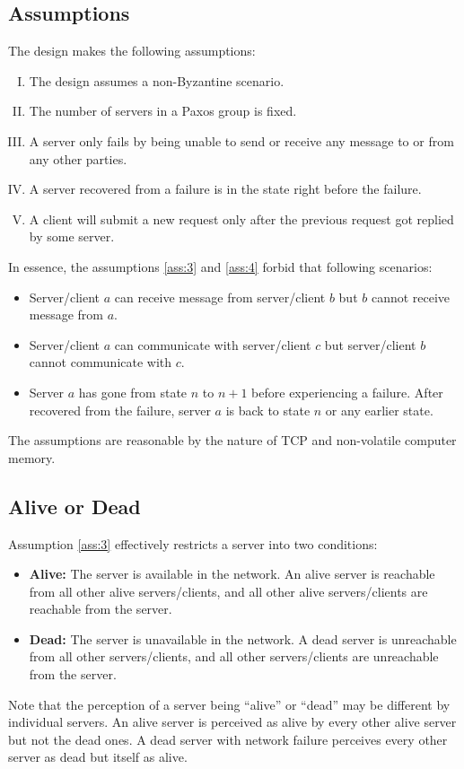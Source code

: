\documentclass{article}
\numberwithin{equation}{section}
\begin{document}
\subsection{Assumptions}
The design makes the following assumptions:
\begin{enumerate}[(I)]
	\item The design assumes a non-Byzantine scenario.
	\item The number of servers in a Paxos group is fixed.
	\item\label{ass:3} A server only fails by being unable to send or receive any message to or from any other parties.
	\item\label{ass:4} A server recovered from a failure is in the state right before the failure.
	\item\label{ass:5} A client will submit a new request only after the previous request got replied by some server.
\end{enumerate}
In essence, the assumptions \ref{ass:3} and \ref{ass:4} forbid that following scenarios:
\begin{itemize}
	\item Server/client $a$ can receive message from server/client $b$ but $b$ cannot receive message from $a$.
	\item Server/client $a$ can communicate with server/client $c$ but server/client $b$ cannot communicate with $c$.
	\item Server $a$ has gone from state $n$ to $n+1$ before experiencing a failure. After recovered from the failure, server $a$ is back to state $n$ or any earlier state.
\end{itemize}
The assumptions are reasonable by the nature of TCP and non-volatile computer memory.

\subsection{Alive or Dead}
Assumption \ref{ass:3} effectively restricts a server into two conditions:
\begin{itemize}
	\item \textbf{Alive:} The server is available in the network. An alive server is reachable from all other alive servers/clients, and all other alive servers/clients are reachable from the server.
	\item \textbf{Dead:} The server is unavailable in the network. A dead server is unreachable from all other servers/clients, and all other servers/clients are unreachable from the server.
\end{itemize}
Note that the perception of a server being ``alive'' or ``dead'' may be different by individual servers. An alive server is perceived as alive by every other alive server but not the dead ones. A dead server with network failure perceives every other server as dead but itself as alive.
\end{document}
